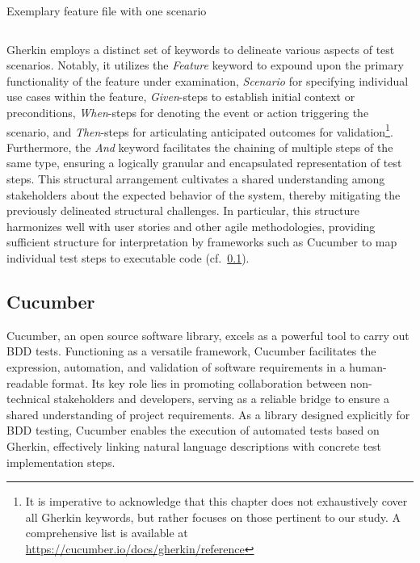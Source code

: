 \begin{listing}[!ht]
\caption{Exemplary feature file with one scenario}
\label{lst:withdrawcash}
\inputminted{gherkin}{files/code/atm.feature}
\end{listing}

 Gherkin employs a distinct set of keywords to delineate various aspects of test scenarios. Notably, it utilizes the \textit{Feature} keyword to expound upon the primary functionality of the feature under examination, \textit{Scenario} for specifying individual use cases within the feature, \textit{Given}-steps to establish initial context or preconditions, \textit{When}-steps for denoting the event or action triggering the scenario, and \textit{Then}-steps for articulating anticipated outcomes for validation\footnote{It is imperative to acknowledge that this chapter does not exhaustively cover all Gherkin keywords, but rather focuses on those pertinent to our study. A comprehensive list is available at \href{https://cucumber.io/docs/gherkin/reference/\#keywords}{https://cucumber.io/docs/gherkin/reference}}. Furthermore, the \textit{And} keyword facilitates the chaining of multiple steps of the same type, ensuring a logically granular and encapsulated representation of test steps. This structural arrangement cultivates a shared understanding among stakeholders about the expected behavior of the system, thereby mitigating the previously delineated structural challenges. In particular, this structure harmonizes well with user stories and other agile methodologies, providing sufficient structure for interpretation by frameworks such as Cucumber to map individual test steps to executable code (cf.~\cref{subsec:cucumber}).


\subsection{Cucumber}
\label{subsec:cucumber}
Cucumber, an open source software library, excels as a powerful tool to carry out \ac{BDD} tests. Functioning as a versatile framework, Cucumber facilitates the expression, automation, and validation of software requirements in a human-readable format. Its key role lies in promoting collaboration between non-technical stakeholders and developers, serving as a reliable bridge to ensure a shared understanding of project requirements. As a library designed explicitly for BDD testing, Cucumber enables the execution of automated tests based on Gherkin, effectively linking natural language descriptions with concrete test implementation steps.

